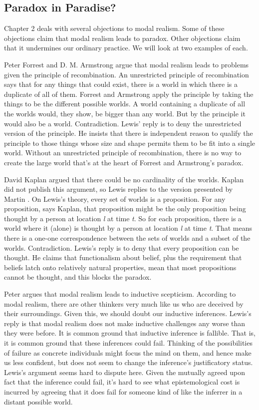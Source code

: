 \subsection{Paradox in Paradise?} Chapter 2 deals with several objections to modal realism. Some of these objections claim that modal realism leads to paradox. Other objections claim that it undermines our ordinary practice. We will look at two examples of each.

Peter Forrest and D. M. Armstrong \citeyearpar{ForrestArmstrong1984} argue that modal realism leads to problems given the principle of recombination. An unrestricted principle of recombination says that for any things that could exist, there is a world in which there is a duplicate of all of them. Forrest and Armstrong apply the principle by taking the things to be the different possible worlds. A world containing a duplicate of all the worlds would, they show, be bigger than any world. But by the principle it would also be a world. Contradiction. Lewis' reply is to deny the unrestricted version of the principle. He insists that there is independent reason to qualify the principle to those things whose size and shape permits them to be fit into a single world. Without an unrestricted principle of recombination, there is no way to create the large world that's at the heart of Forrest and Armstrong's paradox.

David Kaplan argued that there could be no cardinality of the worlds. Kaplan did not publish this argument, so Lewis replies to the version presented by Martin \cite[262]{Davies1981}. On Lewis's theory, every set of worlds is a proposition. For any proposition, says Kaplan, that proposition might be the only proposition being thought by a person at location \textit{l} at time \textit{t}. So for each proposition, there is a world where it (alone) is thought by a person at location \textit{l} at time \textit{t}. That means there is a one-one correspondence between the sets of worlds and a subset of the worlds. Contradiction. Lewis's reply is to deny that every proposition can be thought. He claims that functionalism about belief, plus the requirement that beliefs latch onto relatively natural properties, mean that most propositions cannot be thought, and this blocks the paradox.

Peter \citet{Forrest1982} argues that modal realism leads to inductive scepticism. According to modal realism, there are other thinkers very much like us who are deceived by their surroundings. Given this, we should doubt our inductive inferences. Lewis's reply is that modal realism does not make inductive challenges any worse than they were before. It is common ground that inductive inference is fallible. That is, it is common ground that these inferences could fail. Thinking of the possibilities of failure as concrete individuals might focus the mind on them, and hence make us less confident, but does not seem to change the inference's justificatory status. Lewis's argument seems hard to dispute here. Given the mutually agreed upon fact that the inference could fail, it's hard to see what epistemological cost is incurred by agreeing that it does fail for someone kind of like the inferrer in a distant possible world.

